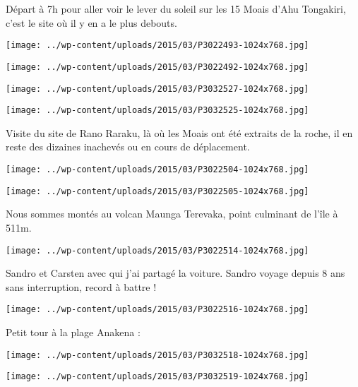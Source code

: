  Départ à 7h pour aller voir le lever du soleil sur les 15 Moais d'Ahu Tongakiri, c'est le site où il y en a le plus debouts.
\begin{center} \texttt{[image: ../wp-content/uploads/2015/03/P3022493-1024x768.jpg]} \end{center}
\begin{center} \texttt{[image: ../wp-content/uploads/2015/03/P3022492-1024x768.jpg]} \end{center}
\begin{center} \texttt{[image: ../wp-content/uploads/2015/03/P3032527-1024x768.jpg]} \end{center}
\begin{center} \texttt{[image: ../wp-content/uploads/2015/03/P3032525-1024x768.jpg]} \end{center}

Visite du site de Rano Raraku, là où les Moais ont été extraits de la roche, il en reste des dizaines inachevés ou en cours de déplacement.
\begin{center} \texttt{[image: ../wp-content/uploads/2015/03/P3022504-1024x768.jpg]} \end{center}
\begin{center} \texttt{[image: ../wp-content/uploads/2015/03/P3022505-1024x768.jpg]} \end{center}

 Nous sommes montés au volcan Maunga Terevaka, point culminant de l'île à 511m.
\begin{center} \texttt{[image: ../wp-content/uploads/2015/03/P3022514-1024x768.jpg]} \end{center}

\pagebreak
 Sandro et Carsten avec qui j'ai partagé la voiture. Sandro voyage depuis 8 ans sans interruption, record à battre !
\begin{center} \texttt{[image: ../wp-content/uploads/2015/03/P3022516-1024x768.jpg]} \end{center}

Petit tour à la plage Anakena :
\begin{center} \texttt{[image: ../wp-content/uploads/2015/03/P3032518-1024x768.jpg]} \end{center}
\begin{center} \texttt{[image: ../wp-content/uploads/2015/03/P3032519-1024x768.jpg]} \end{center}

